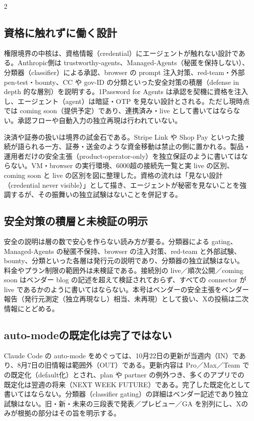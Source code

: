 \documentclass[lualatex,a4paper,10pt]{jlreq}
\begin{document}
\begin{multicols}{2} %


\subsection*{資格に触れずに働く設計}


権限境界の中核は、資格情報（credential）にエージェントが触れない設計である。Anthropic側は trustworthy-agents、Managed-Agents（秘匿を保持しない）、分類器（classifier）による承認、browser の prompt 注入対策、red-team・外部 pen-test・bounty、CC や gov-ID の分類といった安全対策の積層（defense in depth 的な層別）を説明する。1Password for Agents は承認を契機に資格を注入し、エージェント（agent）は暗証・OTP を見ない設計とされる。ただし現時点では coming soon（提供予定）であり、連携済み・live として書いてはならない。承認フローや自動入力の独立再現は行われていない。


決済や証券の扱いは境界の試金石である。Stripe Link や Shop Pay といった接続が語られる一方、証券・送金のような資金移動は禁止の側に置かれる。製品・運用者だけの安全主張（product-operator-only）を独立保証のように書いてはならない。VM・browser の実行環境、6000超の接続先一覧と実 live の区別、coming soon と live の区別を図に整理した。資格の流れは「見ない設計（credential never visible）」として描き、エージェントが秘密を見ないことを強調するが、その振舞いの独立試験はないことを併記する。


\subsection*{安全対策の積層と未検証の明示}


安全の説明は層の数で安心を作らない読み方が要る。分類器による gating、Managed-Agents の秘匿不保持、browser の注入対策、red-team と外部試験、bounty、分類といった各層は発行元の説明であり、分類器の独立試験はない。料金やプラン制限の範囲外は未検証である。接続別の live／順次公開／coming soon はベンダー blog の記述を超えて検証されておらず、すべての connector が live であるかのように書いてはならない。本号はベンダーの安全主張をベンダー報告（発行元測定（独立再現なし）相当、未再現）として扱い、Xの投稿は二次情報にとどめる。


\subsection*{auto-modeの既定化は完了ではない}


Claude Code の auto-mode をめぐっては、10月22日の更新が当週内（IN）であり、8月7日の旧情報は範囲外（OUT）である。更新内容は Pro／Max／Team での既定化（default化）とされ、plan や partner の例外つき、多くのアプリでの既定化は翌週の将来（NEXT WEEK FUTURE）である。完了した既定化として書いてはならない。分類器（classifier gating）の詳細はベンダー記述であり独立試験はない。旧・新・未来の三段表で発表／プレビュー／GA を別列にし、Xのみが根拠の部分はその旨を明示する。


\end{multicols} %
\end{document}
